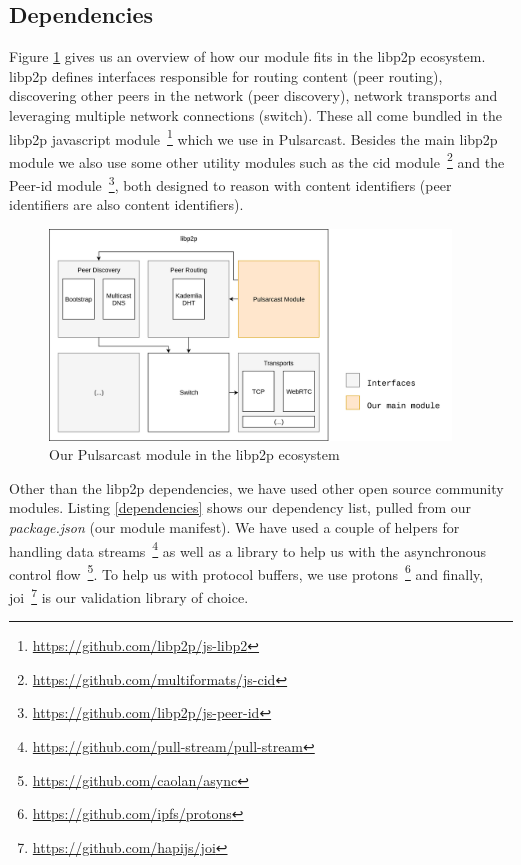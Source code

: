 \subsection{Dependencies}\label{subsec:dependencies}

Figure \ref{fig:pulsarcast-in-libp2p} gives us an overview of how our module
fits in the libp2p ecosystem. libp2p defines interfaces responsible for routing
content (peer routing), discovering other peers in the network (peer
discovery), network transports and leveraging multiple network connections
(switch). These all come bundled in the libp2p javascript
module~\footnote{\url{https://github.com/libp2p/js-libp2}} which we use in
Pulsarcast. Besides the main libp2p module we also use some other utility
modules such as the \acrshort{cid}
module~\footnote{\url{https://github.com/multiformats/js-cid}} and the Peer-id
module~\footnote{\url{https://github.com/libp2p/js-peer-id}}, both designed to reason
with content identifiers (peer identifiers are also content identifiers). 

\begin{figure}[hb!]
  \centering
  \includegraphics[width=0.95\textwidth]{../images/pulsarcast-in-libp2p.png}
  \caption{Our Pulsarcast module in the libp2p ecosystem}
  \label{fig:pulsarcast-in-libp2p}
\end{figure}

Other than the libp2p dependencies, we have used other open source community
modules. Listing \ref{dependencies} shows our dependency list, pulled from our \emph{package.json} (our module manifest). We have used a couple of helpers
for handling data streams~\footnote{\url{https://github.com/pull-stream/pull-stream}}
as well as a library to help us with the asynchronous control
flow~\footnote{\url{https://github.com/caolan/async}}. To help us with protocol
buffers, we use protons~\footnote{\url{https://github.com/ipfs/protons}} and finally,
joi~\footnote{\url{https://github.com/hapijs/joi}} is our validation library of
choice.

